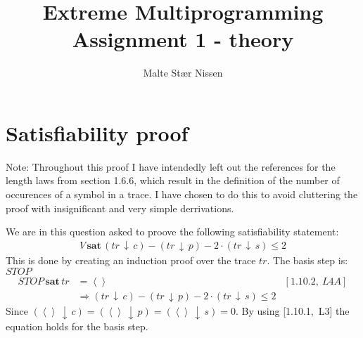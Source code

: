\documentclass[11pt,a4paper]{article}
\title{Extreme Multiprogramming\\Assignment 1 - theory}
\author{Malte Stær Nissen}
\def\count{\,\downarrow\,}
\def\sat{\,\textbf{sat}\,}
\newcommand{\ab}[1]{\left \langle #1 \right \rangle}
\begin{document}
\maketitle

\section{Satisfiability proof}
Note: Throughout this proof I have intendedly left out the references for the
length laws from section 1.6.6, which result in the definition of the number of
occurences of a symbol in a trace. I have chosen to do this to avoid cluttering
the proof with insignificant and very simple derrivations.

We are in this question asked to proove the following satisfiability statement:
\begin{align*}
    V \sat (tr \count c) - (tr \count p) - 2 \cdot (tr \count s) \leq 2 
\end{align*}
This is done by creating an induction proof over the trace $tr$. The basis step
is: $STOP$
\begin{align*}
    STOP \sat tr &= \ab{ } & [1.10.2,~L4A] \\
                 & \Rightarrow (tr \count c) - (tr \count p) - 2 \cdot (tr
                 \count s) \leq 2
\end{align*}
Since $(\ab{ } \count c) = (\ab{ } \count p) = (\ab{ } \count s) = 0$. By using
[1.10.1,~L3] the equation holds for the basis step.
\end{document}
